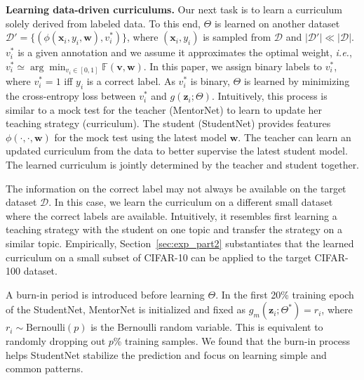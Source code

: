 \documentclass{article}
\newcommand{\ie}{\emph{i.e.}} \newcommand{\Ie}{\emph{I.e}}
\begin{document}
\textbf{Learning data-driven curriculums.} Our next task is to learn a curriculum solely derived from labeled data. To this end, $\Theta$ is learned on another dataset $\mathcal{D}' = \{(\phi(\mathbf{x}_i, y_i, \mathbf{w}), v_i^*)\}$, where $(\mathbf{x}_i, y_i)$ is sampled from $\mathcal{D}$ and $|\mathcal{D}'| \ll |\mathcal{D}|$. $v_i^*$ is a given annotation and we assume it approximates the optimal weight, \ie, $v_i^* \simeq \arg\min_{v_i \in [0,1]} \mathbb{F} (\mathbf{v}, \mathbf{w})$. In this paper, we assign binary labels to $v_i^*$, where $v_i^*=1$ iff $y_i$ is a correct label. As $v_i^*$ is binary, $\Theta$ is learned by minimizing the cross-entropy loss between $v_i^*$ and $g(\mathbf{z}_i; \Theta)$. Intuitively, this process is similar to a mock test for the teacher (MentorNet) to learn to update her teaching strategy (curriculum). The student (StudentNet) provides features $\phi(\cdot, \cdot, \mathbf{w})$ for the mock test using the latest model $\mathbf{w}$. The teacher can learn an updated curriculum from the data to better supervise the latest student model. The learned curriculum is jointly determined by the teacher and student together.

The information on the correct label may not always be available on the target dataset $\mathcal{D}$. In this case, we learn the curriculum on a different small dataset where the correct labels are available. Intuitively, it resembles first learning a teaching strategy with the student on one topic and transfer the strategy on a similar topic. Empirically, Section~\ref{sec:exp_part2} substantiates that the learned curriculum on a small subset of CIFAR-10 can be applied to the target CIFAR-100 dataset.

A burn-in period is introduced before learning $\Theta$. In the first 20\% training epoch of the StudentNet, MentorNet is initialized and fixed as $g_m(\mathbf{z}_i ;\Theta^*)=r_i$, where $r_i \sim \text{Bernoulli}(p)$ is the Bernoulli random variable. This is equivalent to randomly dropping out $p$\% training samples. We found that the burn-in process helps StudentNet stabilize the prediction and focus on learning simple and common patterns.
\end{document}
